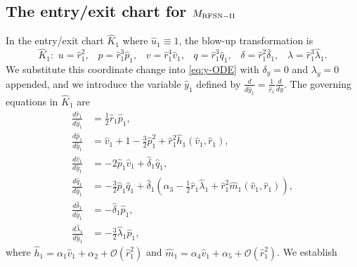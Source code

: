 \documentclass[11pt]{article}
\numberwithin{equation}{section}
\begin{document}
\subsection{The entry/exit chart for \texorpdfstring{$M_{\rm RFSN-II}$}{Lg}}
\label{sec:K1-RFSNII}
In the entry/exit chart $\hat{K}_1$ where $\hat{u}_1\equiv 1$, the blow-up transformation is
\begin{equation} \label{eq:K1-coords-RFSNII}
\hat{K}_1: \, \, 
  u = \hat{r}_1^2, \, \, \, \, \, 
  p = \hat{r}_1^3 \hat{p}_1, \, \, \, \,  \,
  v = \hat{r}_1^4 \hat{v}_1, \, \, \, \,  \, 
  q = \hat{r}_1^3 \hat{q}_1, \, \,  \, \, \, 
  \delta=\hat{r}_1^2 \hat{\delta}_1, \, \, \, \, \,
  \lambda=\hat{r}_1^3 \hat{\lambda}_1.
\end{equation}
We substitute this coordinate change into \eqref{eq:y-ODE} with $\delta_y=0$ and $\lambda_y=0$ appended, and we 
introduce the variable $\hat{y}_1$ defined 
by $\frac{d}{d\hat{y}_1} = \frac{1}{\hat{r}_1} \frac{d}{dy}$.
The governing equations in $\hat{K}_1$ are
\begin{equation} \label{eq:K1-RFSNII}
\begin{split}
    \frac{d\hat{r}_1}{d\hat{y}_1} &= \tfrac{1}{2} \hat{r}_1 \hat{p}_1, \\ 
    \frac{d\hat{p}_1}{d\hat{y}_1} &= \hat{v}_1 + 1 - \tfrac{3}{2} \hat{p}_1^2 + \hat{r}_1^2 \hat{h}_1(\hat{v}_1,\hat{r}_1), \\
    \frac{d\hat{v}_1}{d\hat{y}_1} &= - 2 \hat{p}_1 \hat{v}_1 + \hat{\delta}_1 \hat{q}_1 , \\
    \frac{d\hat{q}_1}{d\hat{y}_1} &= -\tfrac{3}{2} \hat{p}_1 \hat{q}_1 + \hat{\delta}_1 \left( \alpha_3 -\tfrac{1}{2}\hat{r}_1\hat{\lambda}_1 + \hat{r}_1^2 \hat{m}_1(\hat{v}_1,\hat{r}_1)\right), \\
    \frac{d\hat{\delta}_1}{d\hat{y}_1} &= - \hat{\delta}_1 \hat{p}_1, \\
    \frac{d\hat{\lambda}_1}{d\hat{y}_1} &= -\tfrac{3}{2}\hat{\lambda}_1 \hat{p}_1,
\end{split}
\end{equation}
where $\hat{h}_1= \alpha_1 \hat{v}_1 + \alpha_2 + \mathcal{O}(\hat{r}_1^2)$
and $\hat{m}_1=  \alpha_4 \hat{v}_1 + \alpha_5 + \mathcal{O}(\hat{r}_1^2)$.
We establish
\end{document}
